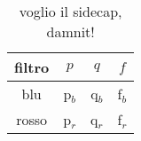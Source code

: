 \begin{table}[H]
    \centering
    \small
    \begin{tabular}{c | c c c}
		filtro & $p$ & $q$ & $f$ \\
        \midrule
		blu & p$_b$ & q$_b$ & f$_b$ \\
		rosso & p$_r$ & q$_r$ & f$_r$ \\
        \bottomrule
    \end{tabular}
    \caption{voglio il sidecap, damnit!}
    \label{tab:ab_crom}
\end{table}
